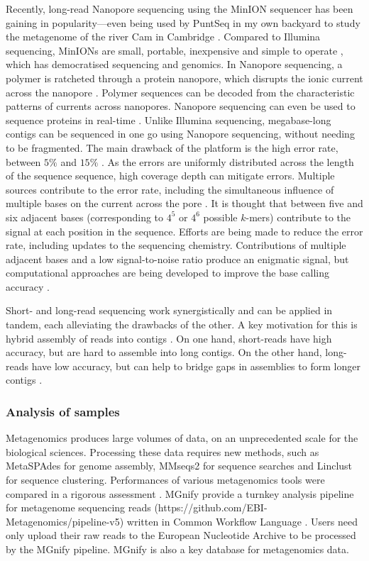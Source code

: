 Recently, long-read Nanopore sequencing \cite{Deamer2016} using the MinION sequencer has been gaining in popularity---even being used by PuntSeq in my own backyard to study the metagenome of the river Cam in Cambridge \cite{Urban2020}. Compared to Illumina sequencing, MinIONs are small, portable, inexpensive and simple to operate \cite{Jain2016}, which has democratised sequencing and genomics. In Nanopore sequencing, a polymer is ratcheted through a protein nanopore, which disrupts the ionic current across the nanopore \cite{GEORGE1996}. Polymer sequences can be decoded from the characteristic patterns of currents across nanopores. Nanopore sequencing can even be used to sequence proteins in real-time \cite{Ouldali2020}. Unlike Illumina sequencing, megabase-long contigs can be sequenced in one go using Nanopore sequencing, without needing to be fragmented. The main drawback of the platform is the high error rate, between $5\%$ and $15\%$ \cite{Rang2018}. As the errors are uniformly distributed across the length of the sequence sequence, high coverage depth can mitigate errors. Multiple sources contribute to the error rate, including the simultaneous influence of multiple bases on the current across the pore \cite{Rang2018}. It is thought that between five and six adjacent bases (corresponding to $4^5$ or $4^6$ possible $k$-mers) contribute to the signal at each position in the sequence. Efforts are being made to reduce the error rate, including updates to the sequencing chemistry. Contributions of multiple adjacent bases and a low signal-to-noise ratio produce an enigmatic signal, but computational approaches are being developed to improve the base calling accuracy \cite{Rang2018,Wick2019}.

Short- and long-read sequencing work synergistically and can be applied in tandem, each alleviating the drawbacks of the other. A key motivation for this is hybrid assembly of reads into contigs \cite{Antipov2016}. On one hand, short-reads have high accuracy, but are hard to assemble into long contigs. On the other hand, long-reads have low accuracy, but can help to bridge gaps in assemblies to form longer contigs \cite{Overholt2019}.

\subsubsection{Analysis of samples}

Metagenomics produces large volumes of data, on an unprecedented scale for the biological sciences. Processing these data requires new methods, such as MetaSPAdes \cite{Nurk2017} for genome assembly, MMseqs2 \cite{Steinegger2017} for sequence searches and Linclust \cite{Steinegger2018} for sequence clustering. Performances of various metagenomics tools were compared in a rigorous assessment \cite{Sczyrba2017}. MGnify \cite{Mitchell2020} provide a turnkey analysis pipeline for metagenome sequencing reads (https://github.com/EBI-Metagenomics/pipeline-v5) written in Common Workflow Language \cite{Amstutz2016}. Users need only upload their raw reads to the European Nucleotide Archive \cite{Amid2020} to be processed by the MGnify pipeline. MGnify is also a key database for metagenomics data.

